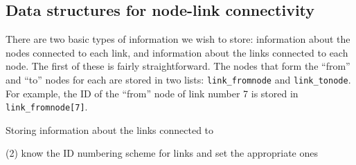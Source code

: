 \documentclass[12pt]{amsart}
\newcommand{\code}[1]{{\tt #1}}
\begin{document}
\subsection{Data structures for node-link connectivity}

There are two basic types of information we wish to store: information about the nodes connected to each link, and information about the links connected to each node.
The first of these is fairly straightforward. 
The nodes that form the ``from'' and ``to'' nodes for each are stored in two lists: \code{link\_fromnode} and \code{link\_tonode}. For example, the ID of the ``from'' node of link number 7 is stored in \code{link\_fromnode[7]}. 

Storing information about the links connected to 





%
%
%
%
%
%        
%
%
%
%
%

%	
			
(2) know the ID numbering scheme for links and set the appropriate ones

	
			
\end{document}
